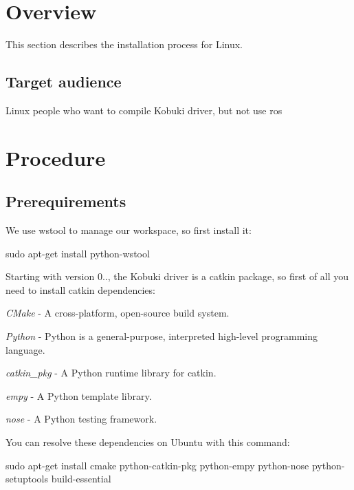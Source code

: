 \section{\-Overview}\label{koMainPage_Overview}
\-This section describes the installation process for \-Linux.\subsection{\-Target audience}\label{enMainPage_who}
\-Linux people who want to compile \-Kobuki driver, but not use ros\section{\-Procedure}\label{enInstallationLinuxGuide_Procedure}
\subsection{\-Prerequirements}\label{enInstallationLinuxGuide_prereq}
\-We use wstool to manage our workspace, so first install it\-:


\begin{DoxyCode}
  sudo apt-get install python-wstool
\end{DoxyCode}


\-Starting with version 0.., the \-Kobuki driver is a catkin package, so first of all you need to install catkin dependencies\-:


\begin{DoxyItemize}
\item {\itshape \-C\-Make\/} -\/ \-A cross-\/platform, open-\/source build system.
\item {\itshape \-Python\/} -\/ \-Python is a general-\/purpose, interpreted high-\/level programming language.
\item {\itshape catkin\-\_\-pkg\/} -\/ \-A \-Python runtime library for catkin.
\item {\itshape empy\/} -\/ \-A \-Python template library.
\item {\itshape nose\/} -\/ \-A \-Python testing framework.
\end{DoxyItemize}

\-You can resolve these dependencies on \-Ubuntu with this command\-:


\begin{DoxyCode}
  sudo apt-get install cmake python-catkin-pkg python-empy python-nose python-
      setuptools build-essential
\end{DoxyCode}


